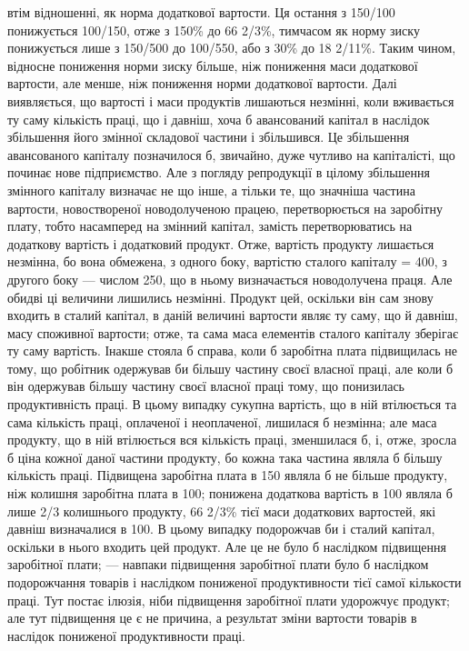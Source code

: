 втім відношенні, як норма додаткової вартости. Ця остання з 150/100 понижується
100/150, отже з 150\% до 66  2/3\%, тимчасом як норму зиску понижується
лише з 150/500 до 100/550, або з 30\% до 18 2/11\%. Таким чином, відносне пониження
норми зиску більше, ніж пониження маси додаткової вартости, але менше, ніж
пониження норми додаткової вартости. Далі виявляється, що вартості і маси продуктів
лишаються незмінні, коли вживається ту саму кількість праці, що і давніш,
хоча б авансований капітал в наслідок збільшення його змінної складової частини
і збільшився. Це збільшення авансованого капіталу позначилося б, звичайно,
дуже чутливо на капіталісті, що починає нове підприємство. Але з погляду
репродукції в цілому збільшення змінного капіталу визначає не що інше, а тільки
те, що значніша частина вартости, новоствореної новодолученою працею, перетворюється на заробітну
плату, тобто насамперед на змінний капітал, замість
перетворюватись на додаткову вартість і додатковий продукт. Отже, вартість
продукту лишається незмінна, бо вона обмежена, з одного боку, вартістю
сталого капіталу = 400, з другого боку — числом 250, що в ньому визначається
новодолучена праця. Але обидві ці величини лишились незмінні. Продукт цей,
оскільки він сам знову входить в сталий капітал, в даній величині вартости
являє ту саму, що й давніш, масу споживної вартости; отже, та сама маса
елементів сталого капіталу зберігає ту саму вартість. Інакше стояла б справа,
коли б заробітна плата підвищилась не тому, що робітник одержував би більшу
частину своєї власної праці, але коли б він одержував більшу частину своєї
власної праці тому, що понизилась продуктивність праці. В цьому випадку сукупна
вартість, що в ній втілюється та сама кількість праці, оплаченої і неоплаченої,
лишилася б незмінна; але маса продукту, що в ній втілюється вся
кількість праці, зменшилася б, і, отже, зросла б ціна кожної даної частини
продукту, бо кожна така частина являла б більшу кількість праці. Підвищена
заробітна плата в 150 являла б не більше продукту, ніж колишня заробітна
плата в 100; понижена додаткова вартість в 100 являла б лише 2/3 колишнього
продукту, 66  2/3\% тієї маси додаткових вартостей, які давніш визначалися
в 100. В цьому випадку подорожчав би і сталий капітал, оскільки в нього
входить цей продукт. Але це не було б наслідком підвищення заробітної плати;
— навпаки підвищення заробітної плати було б наслідком подорожчання
товарів і наслідком пониженої продуктивности тієї самої кількости праці. Тут
постає ілюзія, ніби підвищення заробітної плати удорожчує продукт; але тут
підвищення це є не причина, а результат зміни вартости товарів в наслідок
пониженої продуктивности праці.

